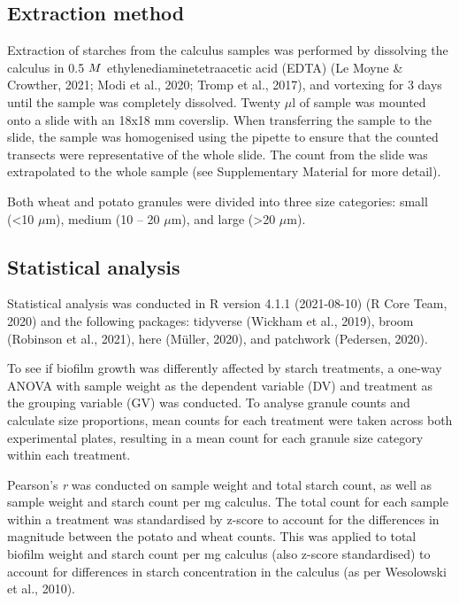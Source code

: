 \documentclass[
]{article}
\begin{document}
\hypertarget{extraction-method}{%
\subsection{Extraction method}\label{extraction-method}}

Extraction of starches from the calculus samples was performed by dissolving the
calculus in 0.5 \(\tiny{M}\) ethylenediaminetetraacetic acid (EDTA)
(Le Moyne \& Crowther, 2021; Modi et al., 2020; Tromp et al., 2017),
and vortexing for 3 days until the sample was completely dissolved.
Twenty \(\mu\)l of sample was mounted onto a slide with an 18x18 mm coverslip.
When transferring the sample to the slide, the sample was homogenised using
the pipette to ensure that the counted transects were representative of the
whole slide. The count from the slide was extrapolated to the whole sample
(see Supplementary Material for more detail).

Both wheat and potato granules were divided into three size categories:
small (\textless10 \(\mu\)m), medium (10 -- 20 \(\mu\)m), and large (\textgreater20 \(\mu\)m).

\hypertarget{statistical-analysis}{%
\subsection{Statistical analysis}\label{statistical-analysis}}

Statistical analysis was conducted in R version 4.1.1 (2021-08-10) (R Core Team, 2020) and
the following packages: tidyverse (Wickham et al., 2019), broom (Robinson et al., 2021),
here (Müller, 2020), and patchwork (Pedersen, 2020).

To see if biofilm growth was differently affected by starch treatments, a
one-way ANOVA with sample weight as the dependent variable (DV) and treatment
as the grouping variable (GV) was conducted.
To analyse granule counts and calculate size proportions, mean counts for each
treatment were taken across
both experimental plates, resulting in a mean count for each
granule size category within each treatment.

Pearson's \emph{r} was conducted on sample weight and total starch count, as well as sample
weight and starch count per mg calculus. The total count for each sample within a
treatment was standardised by z-score to account for the differences in magnitude
between the potato and wheat counts.
This was applied to total biofilm weight and starch count per mg
calculus (also z-score standardised) to account for differences in starch
concentration in the calculus (as per Wesolowski et al., 2010).
\end{document}
